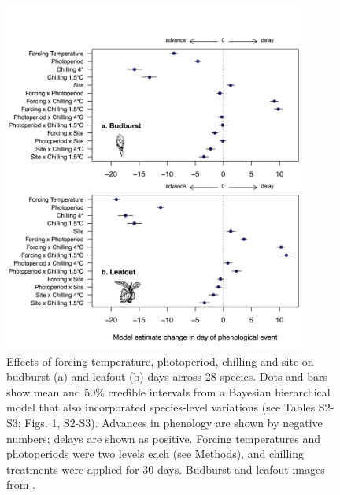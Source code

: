 \documentclass[11pt]{article}
\begin{document}
\newpage
\begin{figure}[h!]
\centering
\noindent \includegraphics[width=0.9\textwidth]{images/Fig1_bb_lo.png}
\caption{Effects of forcing temperature, photoperiod, chilling and site on budburst (a) and leafout (b) days across 28 species. Dots and bars show mean and 50\% credible intervals from a Bayesian hierarchical model that also incorporated species-level variations (see Tables S2-S3; Figs. 1, S2-S3). Advances in phenology are shown by negative numbers; delays are shown as positive. Forcing temperatures and photoperiods were two levels each (see Methods), and chilling treatments were applied for 30 days. Budburst and leafout images from \citet{Finn:2007}.}
\label{fig:maineff}
\end{figure}
\end{document}
